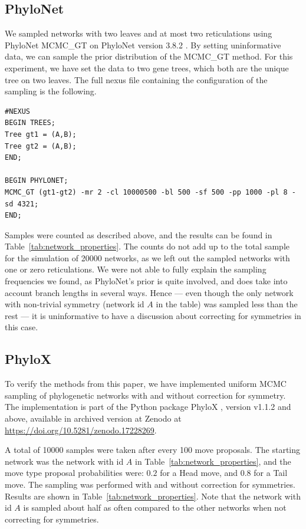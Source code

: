 \documentclass{article}
\theoremstyle{definition}
\begin{document}
\subsection{PhyloNet}
We sampled networks with two leaves and at most two reticulations using PhyloNet MCMC\_GT on PhyloNet version 3.8.2 \cite{wen2016bayesian,wen2018inferring}. By setting uninformative data, we can sample the prior distribution of the MCMC\_GT method. For this experiment, we have set the data to two gene trees, which both are the unique tree on two leaves. The full nexus file containing the configuration of the sampling is the following.
\begin{verbatim}
#NEXUS
BEGIN TREES;
Tree gt1 = (A,B);
Tree gt2 = (A,B);
END;

BEGIN PHYLONET;
MCMC_GT (gt1-gt2) -mr 2 -cl 10000500 -bl 500 -sf 500 -pp 1000 -pl 8 -sd 4321;
END;
\end{verbatim}
Samples were counted as described above, and the results can be found in Table~\ref{tab:network_properties}. The counts do not add up to the total sample for the simulation of 20000 networks, as we left out the sampled networks with one or zero reticulations. We were not able to fully explain the sampling frequencies we found, as PhyloNet's prior is quite involved, and does take into account branch lengths in several ways. Hence --- even though the only network with non-trivial symmetry (network id $A$ in the table) was sampled less than the rest --- it is uninformative to have a discussion about correcting for symmetries in this case. 

\subsection{PhyloX}
To verify the methods from this paper, we have implemented uniform MCMC sampling of phylogenetic networks with and without correction for symmetry. The implementation is part of the Python package PhyloX \cite{janssen2024phylox}, version v1.1.2 and above, available in archived version at Zenodo at \url{https://doi.org/10.5281/zenodo.17228269}.

A total of 10000 samples were taken after every 100 move proposals. The starting network was the network with id $A$ in Table~\ref{tab:network_properties}, and the move type proposal probabilities were: $0.2$ for a Head move, and $0.8$ for a Tail move. The sampling was performed with and without correction for symmetries. Results are shown in Table~\ref{tab:network_properties}. Note that the network with id $A$ is sampled about half as often compared to the other networks when not correcting for symmetries.
\end{document}
